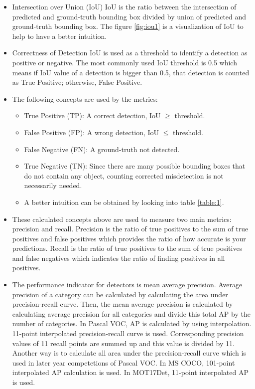 \documentclass{article}
\begin{document}
\begin{itemize}
    \item Intersection over Union (IoU)
    IoU is the ratio between the intersection of predicted and ground-truth bounding box 
    divided by union of predicted and ground-truth bounding box. The figure \ref{fig:iou1} is a 
    visualization of IoU to help to have a better intuition.
    \item Correctness of Detection
    IoU is used as a threshold to identify a detection as positive or negative. The 
    most commonly used IoU threshold is 0.5 which means if IoU value of a detection is 
    bigger than 0.5, that detection is counted as True Positive; otherwise, False Positive.
    \item The following concepts are used by the metrics:
    \begin{itemize}
        \item True Positive (TP): A correct detection, IoU $\geq$ threshold. 
        \item False Positive (FP): A wrong detection, IoU $\leq$ threshold.
        \item False Negative (FN): A ground-truth not detected.
        \item True Negative (TN): Since there are many possible bounding boxes that 
        do not contain any object, counting corrected misdetection is not necessarily 
        needed.
        \item A better intuition can be obtained by looking into table \ref{table:1}.
    \end{itemize}
    \item These calculated concepts above are used to measure two main metrics: precision and 
    recall. Precision is the ratio of true positives to the sum of true positives and false 
    positives which provides the ratio of how accurate is your predictions. Recall is the ratio 
    of true positives to the sum of true positives and false negatives which indicates the ratio of 
    finding positives in all positives.
    \item The performance indicator for detectors is mean average precision. Average precision of a 
    category can be calculated by calculating the area under precision-recall curve. Then, the mean 
    average precision is calculated by calculating average precision for all categories and divide 
    this total AP by the number of categories. In Pascal VOC, AP is calculated by using interpolation. 
    11-point interpolated precision-recall curve is used. Corresponding precision values of 11 recall 
    points are summed up and this value is divided by 11. Another way is to calculate all area under 
    the precision-recall curve which is used in later year competetions of Pascal VOC. In MS COCO, 
    101-point interpolated AP calculation is used. In MOT17Det, 11-point interpolated AP is used.  
\end{itemize}
\end{document}

